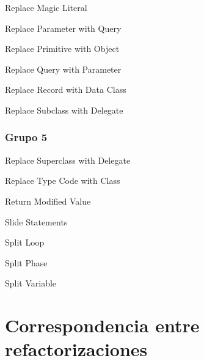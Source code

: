 \documentclass[11pt,a4paper,oneside]{book}
\begin{document}
Replace Magic Literal

Replace Parameter with Query

Replace Primitive with Object

Replace Query with Parameter

Replace Record with Data Class

Replace Subclass with Delegate

\subsection{Grupo 5}
Replace Superclass with Delegate

Replace Type Code with Class

Return Modified Value

Slide Statements

Split Loop

Split Phase

Split Variable



\chapter*{Correspondencia entre refactorizaciones}
\end{document}
